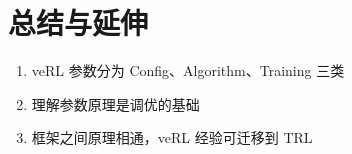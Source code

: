 \section{总结与延伸}
\begin{enumerate}
  \item veRL 参数分为 Config、Algorithm、Training 三类
  \item 理解参数原理是调优的基础
  \item 框架之间原理相通，veRL 经验可迁移到 TRL
\end{enumerate}


